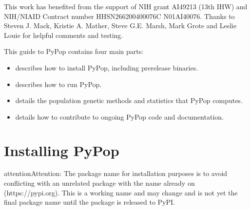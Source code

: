 \documentclass[letterpaper,10pt,english,openany,oneside]{sphinxmanual}
\begin{document}
\label{\detokenize{docs/index:acknowlegements}}
\sphinxAtStartPar
{}

\sphinxAtStartPar
This work has benefited from the support of NIH grant AI49213 (13th
IHW) and NIH/NIAID Contract number HHSN266200400076C
N01\sphinxhyphen{}AI\sphinxhyphen{}40076. Thanks to Steven J. Mack, Kristie A. Mather, Steve G.E.
Marsh, Mark Grote and Leslie Louie for helpful comments and testing.

\sphinxAtStartPar
{}

\sphinxAtStartPar
This guide to PyPop contains four main parts:
\begin{itemize}
\item {} 
\sphinxAtStartPar
{\hyperref[\detokenize{docs/guide-chapter-install::doc}]{}} describes how to install PyPop,
including pre\sphinxhyphen{}release binaries.

\item {} 
\sphinxAtStartPar
{\hyperref[\detokenize{docs/guide-chapter-usage::doc}]{}} describes how to run PyPop.

\item {} 
\sphinxAtStartPar
{\hyperref[\detokenize{docs/guide-chapter-instructions::doc}]{}} details the population genetic
methods and statistics that PyPop computes.

\item {} 
\sphinxAtStartPar
{\hyperref[\detokenize{docs/guide-chapter-contributing::doc}]{}} details how to contribute to
ongoing PyPop code and documentation.

\end{itemize}
\label{\detokenize{docs/index:user-guide-toc}}
\sphinxstepscope


\chapter{Installing PyPop}
\label{\detokenize{docs/guide-chapter-install:installing-pypop}}\label{\detokenize{docs/guide-chapter-install::doc}}
\begin{sphinxadmonition}{attention}{Attention:}
\sphinxAtStartPar
The package name for installation purposes is  \sphinxhyphen{} to avoid
conflicting with an unrelated package with the name 
already on  (https://pypi.org). This is a working name and
may change and is not yet the final package name until the package
is released to PyPI.
\end{sphinxadmonition}
\end{document}
